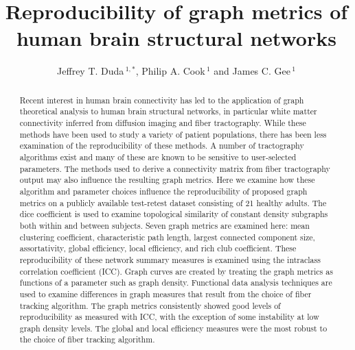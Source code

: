 \documentclass{frontiersSCNS} %
\def\journal{Neurosciences}
\def\firstAuthorLast{Duda {et~al}} %
\def\Authors{Jeffrey T. Duda\,$^{1,*}$, Philip A. Cook\,$^{1}$ and James C. Gee\,$^1$}
\begin{document}
\onecolumn
{}

\title[Reproducibility of structural graph metrics]{Reproducibility of graph metrics of human brain structural networks}
\author[\firstAuthorLast ]{\Authors}
\address{}
\correspondance{}
\editor{}

\maketitle
\begin{abstract}

Recent interest in human brain connectivity has led to the application of
graph theoretical analysis to human brain structural networks, in
particular white matter connectivity inferred from diffusion imaging
and fiber tractography. While these methods have been used to study a
variety of patient populations, there has been less examination of the
reproducibility of these methods. A number of tractography algorithms
exist and many of these are known to be sensitive to user-selected
parameters. The methods used to derive a connectivity matrix from
fiber tractography output may also influence the resulting graph
metrics. Here we examine how these algorithm and parameter choices
influence the reproducibility of proposed graph metrics on a publicly
available test-retest dataset consisting of 21 healthy adults. 
The dice coefficient is used to examine topological similarity
of constant density subgraphs both within and between subjects.
Seven graph metrics are examined here: mean clustering coefficient, 
characteristic path length, largest connected component size, assortativity,
global efficiency, local efficiency, and rich club coefficient. These reproducibility of
these network summary
measures is examined using the intraclass correlation coefficient
(ICC). Graph curves are created by treating the
graph metrics as functions of a parameter such as graph density.
 Functional data analysis techniques are used
to examine differences in graph measures that result from the choice
of fiber tracking algorithm. The graph metrics consistently showed
good levels of reproducibility as measured with ICC, with the exception of some instability at
low graph density levels. The global and local efficiency measures were 
the most robust to the choice of fiber tracking algorithm.


\end{abstract}
\end{document}
